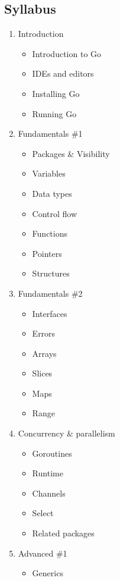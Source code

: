 \documentclass[
  digital,
  color,
  oneside,
  nosansbold,
  nocolorbold,
  lof,
  lot,
]{fithesis4}
\begin{document}
\subsection{Syllabus}

\begin{enumerate}
    \item Introduction
    \begin{itemize}
        \item Introduction to Go
        \item IDEs and editors
        \item Installing Go
        \item Running Go
    \end{itemize}
    \item Fundamentals \#1
    \begin{itemize}
        \item Packages \& Visibility
        \item Variables
        \item Data types
        \item Control flow
        \item Functions
        \item Pointers
        \item Structures
    \end{itemize}
    \item Fundamentals \#2
    \begin{itemize}
        \item Interfaces
        \item Errors
        \item Arrays
        \item Slices
        \item Maps
        \item Range
    \end{itemize}
    \item Concurrency \& parallelism
    \begin{itemize}
        \item Goroutines
        \item Runtime
        \item Channels
        \item Select
        \item Related packages
    \end{itemize}
    \item Advanced \#1
    \begin{itemize}
        \item Generics

\end{itemize}
\end{enumerate}
\end{document}
